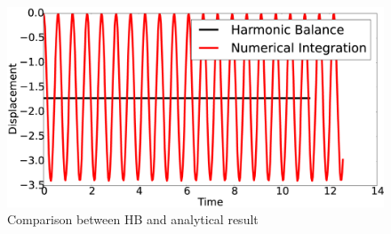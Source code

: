 \documentclass[12pt, a4paper]{extarticle}
\begin{document}
\begin{figure}[h]
	\centering
	\includegraphics[width=12.0 cm]{figure/4N9.eps}
	\caption{Comparison between HB and analytical result}
	\label{fig:hypersonicFlutterResult}
\end{figure}



\end{document}
